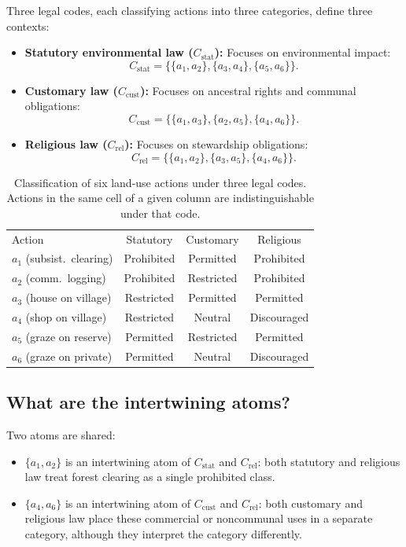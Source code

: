 \documentclass[aps,pra,twocolumn,superscriptaddress,floatfix,longbibliography]{revtex4-2}
\begin{document}
Three legal codes, each classifying actions into three categories,
define three contexts:
\begin{itemize}
\item \textbf{Statutory environmental law ($C_{\text{stat}}$):}
Focuses on environmental impact:
\[
C_{\text{stat}}=\{\{a_1,a_2\},\{a_3,a_4\},\{a_5,a_6\}\}.
\]
\item \textbf{Customary law ($C_{\text{cust}}$):}
Focuses on ancestral rights and communal obligations:
\[
C_{\text{cust}}=\{\{a_1,a_3\},\{a_2,a_5\},\{a_4,a_6\}\}.
\]
\item \textbf{Religious law ($C_{\text{rel}}$):}
Focuses on stewardship obligations:
\[
C_{\text{rel}}=\{\{a_1,a_2\},\{a_3,a_5\},\{a_4,a_6\}\}.
\]
\end{itemize}

\begin{table}[b]
\caption{\label{tab:legal}Classification of six land-use actions
under three legal codes. Actions in the same cell of a given column
are indistinguishable under that code.}
\begin{ruledtabular}
\begin{tabular}{lccc}
Action & Statutory & Customary & Religious \\
\colrule
$a_1$ (subsist.\ clearing) & Prohibited & Permitted & Prohibited \\
$a_2$ (comm.\ logging)     & Prohibited & Restricted & Prohibited \\
$a_3$ (house on village)   & Restricted & Permitted & Permitted \\
$a_4$ (shop on village)    & Restricted & Neutral & Discouraged \\
$a_5$ (graze on reserve)   & Permitted  & Restricted & Permitted \\
$a_6$ (graze on private)   & Permitted  & Neutral & Discouraged \\
\end{tabular}
\end{ruledtabular}
\end{table}

\subsection{What are the intertwining atoms?}

Two atoms are shared:
\begin{itemize}
\item $\{a_1,a_2\}$ is an intertwining atom of $C_{\text{stat}}$
and $C_{\text{rel}}$: both statutory and religious law treat forest
clearing as a single prohibited class.
\item $\{a_4,a_6\}$ is an intertwining atom of $C_{\text{cust}}$
and $C_{\text{rel}}$: both customary and religious law place these
commercial or noncommunal uses in a separate category, although they
interpret the category differently.
\end{itemize}
\end{document}
